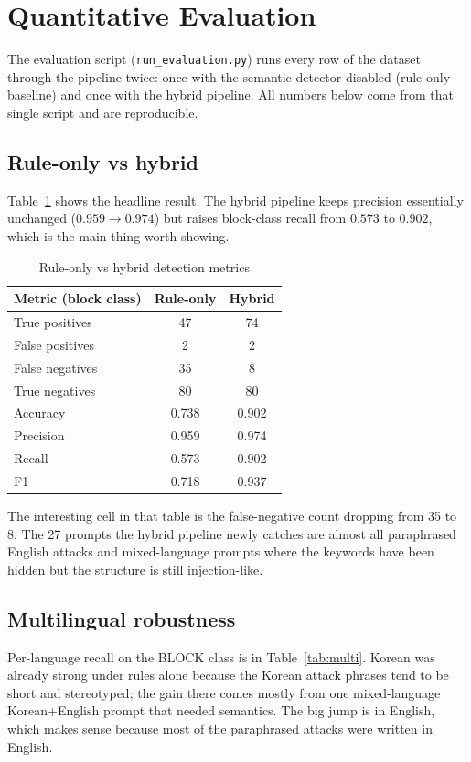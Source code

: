 \documentclass[conference]{IEEEtran}
\begin{document}
\section{Quantitative Evaluation}

The evaluation script (\texttt{run\_evaluation.py}) runs every row of
the dataset through the pipeline twice: once with the semantic detector
disabled (rule-only baseline) and once with the hybrid pipeline. All
numbers below come from that single script and are reproducible.

\subsection{Rule-only vs hybrid}
Table~\ref{tab:metrics} shows the headline result. The hybrid pipeline
keeps precision essentially unchanged ($0.959 \to 0.974$) but raises
block-class recall from $0.573$ to $0.902$, which is the main thing
worth showing.

\begin{table}[t]
\caption{Rule-only vs hybrid detection metrics}
\label{tab:metrics}
\centering
\footnotesize
\begin{tabular}{lcc}
\toprule
\textbf{Metric (block class)} & \textbf{Rule-only} & \textbf{Hybrid} \\
\midrule
True positives  & 47 & 74 \\
False positives & 2  & 2  \\
False negatives & 35 & 8  \\
True negatives  & 80 & 80 \\
\midrule
Accuracy   & 0.738 & 0.902 \\
Precision  & 0.959 & 0.974 \\
Recall     & 0.573 & 0.902 \\
F1         & 0.718 & 0.937 \\
\bottomrule
\end{tabular}
\end{table}

The interesting cell in that table is the false-negative count dropping
from 35 to 8. The 27 prompts the hybrid pipeline newly catches are
almost all paraphrased English attacks and mixed-language prompts where
the keywords have been hidden but the structure is still injection-like.

\subsection{Multilingual robustness}
Per-language recall on the BLOCK class is in Table~\ref{tab:multi}.
Korean was already strong under rules alone because the Korean attack
phrases tend to be short and stereotyped; the gain there comes mostly
from one mixed-language Korean+English prompt that needed semantics.
The big jump is in English, which makes sense because most of the
paraphrased attacks were written in English.
\end{document}

